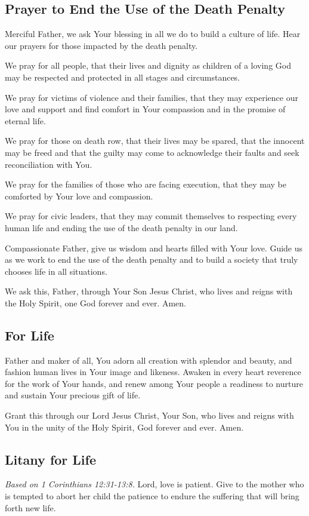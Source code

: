 \documentclass[12pt]{article}
\newcommand{\prayertitle}[1]{\subsection{#1}}
\newcommand{\note}[1]{{\small{\textsl{#1}}}\newline}
\begin{document}
\prayertitle{Prayer to End the Use of the Death Penalty}
Merciful Father, we ask Your blessing in all we do to build a culture of life.
Hear our prayers for those impacted by the death penalty.

We pray for all people, that their lives and dignity as children of a loving God may be respected and protected in all stages and circumstances.

We pray for victims of violence and their families, that they may experience our love and support and find comfort in Your compassion and in the promise of eternal life.

We pray for those on death row, that their lives may be spared, that the innocent may be freed and that the guilty may come to acknowledge their faults and seek reconciliation with You.

We pray for the families of those who are facing execution, that they may be comforted by Your love and compassion.

We pray for civic leaders, that they may commit themselves to respecting every human life and ending the use of the death penalty in our land.

Compassionate Father, give us wisdom and hearts filled with Your love.
Guide us as we work to end the use of the death penalty and to build a society that truly chooses life in all situations.

We ask this, Father, through Your Son Jesus Christ, who lives and reigns with the Holy Spirit, one God forever and ever.
Amen.

\prayertitle{For Life}
Father and maker of all, You adorn all creation with splendor and beauty, and fashion human lives in Your image and likeness.
Awaken in every heart reverence for the work of Your hands, and renew among Your people
a readiness to nurture and sustain Your precious gift of life.

Grant this through our Lord Jesus Christ, Your Son, who lives and reigns with You in 
the unity of the Holy Spirit, God forever and ever.
Amen.
\newpage
\prayertitle{Litany for Life}
\note{Based on 1 Corinthians 12:31-13:8.}
Lord, love is patient.
Give to the mother who is tempted to abort her child the patience to endure the suffering that will bring forth new life.
\end{document}
